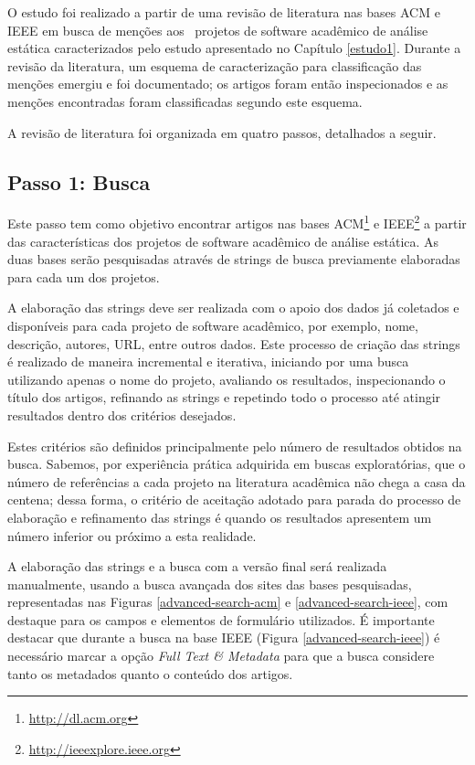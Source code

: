 O estudo foi realizado a partir de uma revisão de literatura nas bases ACM e
IEEE em busca de menções aos \SoftwareCount \ projetos de software acadêmico de
análise estática caracterizados pelo estudo apresentado no Capítulo \ref{estudo1}. 
Durante a revisão da literatura, 
um esquema de caracterização para classificação das menções emergiu e foi documentado;
os artigos foram então inspecionados e as menções encontradas foram classificadas segundo
este esquema.

A revisão de literatura foi organizada em quatro passos, detalhados a seguir.

\subsection{Passo 1: Busca}

Este passo tem como objetivo encontrar artigos nas bases
ACM\footnote{\url{http://dl.acm.org}} e
IEEE\footnote{\url{http://ieeexplore.ieee.org}} a partir das características
dos projetos de software acadêmico de análise estática.
As duas bases serão pesquisadas através de strings de busca previamente
elaboradas para cada um dos projetos.

A elaboração das strings deve ser realizada com o apoio dos dados já coletados
e disponíveis para cada projeto de software acadêmico, por exemplo, nome,
descrição, autores, URL, entre outros dados. Este processo de criação das
strings é realizado de maneira incremental e iterativa, iniciando por uma busca
utilizando apenas o nome do projeto, avaliando os resultados, inspecionando o
título dos artigos, refinando as strings e repetindo todo o processo até
atingir resultados dentro dos critérios desejados.

Estes critérios são definidos principalmente pelo
número de resultados obtidos na busca.
Sabemos, por experiência prática adquirida em buscas exploratórias, 
que o número de referências a cada projeto na
literatura acadêmica não chega a casa da centena; dessa forma, o critério de
aceitação adotado para parada do processo de elaboração e refinamento das strings é
quando os resultados apresentem um número inferior ou próximo a esta realidade.

A elaboração das strings e a busca com a versão final será
realizada manualmente, usando a busca avançada dos sites das bases pesquisadas,
representadas nas Figuras \ref{advanced-search-acm} e
\ref{advanced-search-ieee}, com destaque para os campos e elementos de formulário
utilizados. É importante destacar que durante a busca na
base IEEE (Figura \ref{advanced-search-ieee}) é necessário marcar a opção {\it Full Text \& Metadata} para que a
busca considere tanto os metadados quanto o conteúdo dos artigos.

